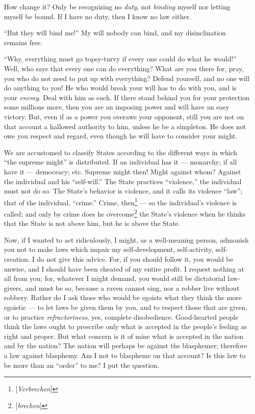 How change it? Only be recognizing no \textit{duty}, not \textit{binding} 
myself nor letting myself be bound. If I have no duty, then I know no law 
either.

``But they will bind me!'' My will nobody can bind, and my disinclination 
remains free.

``Why, everything must go topsy-turvy if every one could do what he would!'' 
Well, who says that every one can do everything? What are you there for, pray, 
you who do not need to put up with everything? Defend yourself, and no one 
will do anything to you! He who would break your will has to do with you, and 
is your \textit{enemy}. Deal with him as such. If there stand behind you for 
your protection some millions more, then you are an imposing power and will 
have an easy victory. But, even if as a power you overawe your opponent, still 
you are not on that account a hallowed authority to him, unless he be a 
simpleton. He does not owe you respect and regard, even though he will have to 
consider your might.

We are accustomed to classify States according to the different ways in which 
``the supreme might'' is distributed. If an individual has it --- monarchy; 
if all have it --- democracy; etc. Supreme might then! Might against whom? 
Against the individual and his ``self-will.'' The State practices 
``violence,'' the individual must not do so. The State's behavior is 
violence, and it calls its violence ``law''; that of the individual, 
``crime.'' Crime, then\footnote{[\textit{Verbrechen}]} --- so the 
individual's violence is called; and only by crime does he 
overcome\footnote{[\textit{brechen}]} the State's violence when he thinks that 
the State is not above him, but he is above the State.

Now, if I wanted to act ridiculously, I might, as a well-meaning person, 
admonish you not to make laws which impair my self-development, self-activity, 
self-creation. I do not give this advice. For, if you should follow it, you 
would be unwise, and I should have been cheated of my entire profit. I request 
nothing at all from you; for, whatever I might demand, you would still be 
dictatorial law-givers, and must be so, because a raven cannot sing, nor a 
robber live without robbery. Rather do I ask those who would be egoists what 
they think the more egoistic --- to let laws be given them by you, and to 
respect those that are given, or to practice \textit{refractoriness}, yes, 
complete disobedience. Good-hearted people think the laws ought to prescribe 
only what is accepted in the people's feeling as right and proper. But what 
concern is it of mine what is accepted in the nation and by the nation? The 
nation will perhaps be against the blasphemer; therefore a law against 
blasphemy. Am I not to blaspheme on that account? Is this law to be more than 
an ``order'' to me? I put the question.

